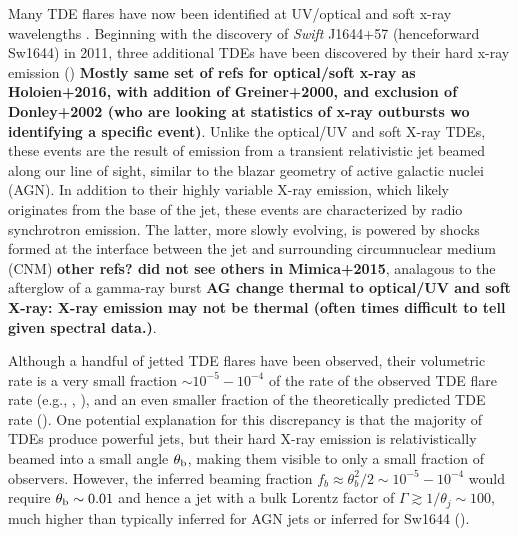 \documentclass[usenatbib,fleqn]{mnras}
\begin{document}
Many TDE flares have now been identified at UV/optical
\citep{Gezari+2008, Gezari+2009, van-Velzen+2011, Gezari+2012,
  Arcavi+2014, Chornock+2014, Holoien+2014, Vinko+2015, Holoien+2016}
and soft x-ray wavelengths \citep{Bade+1996, Grupe+1999,
  Komossa&Greiner1999, Greiner+2000, Esquej+2007, Maksym+2010,
  Saxton+2012}. Beginning with the discovery of {\it Swift} J1644+57
(henceforward Sw1644) in 2011, three additional TDEs have been
discovered by their hard x-ray emission (\citealt{Bloom+2011,
  Levan+2011, Burrows+2011, Zauderer+2011, Cenko+2012, Pasham+2015,
  Brown+2015}) {\bf Mostly same set of refs for optical/soft x-ray as
  Holoien+2016, with addition of Greiner+2000, and exclusion of
  Donley+2002 (who are looking at statistics of x-ray outbursts wo
  identifying a specific event)}.  Unlike the optical/UV and soft
X-ray TDEs, these events are the result of emission from a transient
relativistic jet beamed along our line of sight, similar to the blazar
geometry of active galactic nuclei (AGN).  In addition to their highly
variable X-ray emission, which likely originates from the base of the
jet, these events are characterized by radio synchrotron emission.
The latter, more slowly evolving, is powered by shocks formed at the
interface between the jet and surrounding circumnuclear medium (CNM)
\citep{Bloom+2011,Giannios&Metzger2011,Metzger+2012,Mimica+2015} {\bf
  other refs? did not see others in Mimica+2015}, analagous to the
afterglow of a gamma-ray burst {\bf AG change thermal to optical/UV
  and soft X-ray: X-ray emission may not be thermal (often times
  difficult to tell given spectral data.)}.

Although a handful of jetted TDE flares have been observed, their
volumetric rate is a very small fraction $\sim 10^{-5}-10^{-4}$ of the
rate of the observed TDE flare rate (e.g., \citealt{Burrows+2011},
\citealt{Brown+2015}), and an even smaller fraction of the
theoretically predicted TDE rate (\citealt{Stone&Metzger2016}).  One
potential explanation for this discrepancy is that the majority of
TDEs produce powerful jets, but their hard X-ray emission is
relativistically beamed into a small angle $\theta_{\rm b}$, making
them visible to only a small fraction of observers.  However, the
inferred beaming fraction $f_b \approx \theta_{b}^{2}/2 \sim
10^{-5}-10^{-4}$ would require $\theta_{\rm b} \sim 0.01$ and hence a
jet with a bulk Lorentz factor of $\Gamma \gtrsim 1/\theta_j \sim
100$, much higher than typically inferred for AGN jets or inferred for
Sw1644 (\citealt{Metzger+2012}).
\end{document}
